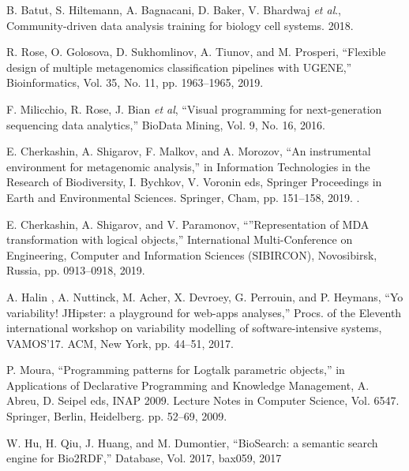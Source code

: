 \documentclass[a4paper]{jpconf}
\begin{document}
\begin{thebibliography}{0}

 B. Batut, S. Hiltemann, A. Bagnacani, D. Baker, V. Bhardwaj \emph{et al}., Community-driven data analysis training for biology cell systems. 2018. 

  R. Rose, O. Golosova, D. Sukhomlinov, A. Tiunov, and M. Prosperi, ``Flexible design of multiple metagenomics classification pipelines with UGENE,'' Bioinformatics, Vol. 35, No. 11, pp. 1963--1965, 2019. 

 F. Milicchio, R. Rose, J. Bian \emph{et al}, ``Visual programming for next-generation sequencing data analytics,'' BioData Mining, Vol. 9, No. 16, 2016. 

 E. Cherkashin, A. Shigarov, F. Malkov, and A. Morozov, ``An instrumental environment for metagenomic analysis,'' in Information Technologies in the Research of Biodiversity, I. Bychkov, V. Voronin eds, Springer Proceedings in Earth and Environmental Sciences. Springer, Cham, pp. 151--158, 2019. .

  E. Cherkashin, A. Shigarov, and V. Paramonov, ``''Representation of MDA transformation with logical objects,'' International Multi-Conference on Engineering, Computer and Information Sciences (SIBIRCON), Novosibirsk, Russia, pp. 0913--0918, 2019. 

 A. Halin , A. Nuttinck, M. Acher, X. Devroey, G. Perrouin, and P. Heymans, ``Yo variability! JHipster: a playground for web-apps analyses,'' Procs. of the Eleventh international workshop on variability modelling of software-intensive systems, VAMOS’17. ACM, New York, pp. 44–51, 2017. 

 P. Moura, ``Programming patterns for Logtalk parametric objects,'' in Applications of Declarative Programming and Knowledge Management, A. Abreu, D. Seipel eds, INAP 2009. Lecture Notes in Computer Science, Vol. 6547. Springer, Berlin, Heidelberg. pp. 52--69, 2009. 

 W. Hu, H. Qiu, J. Huang, and M. Dumontier, ``BioSearch: a semantic search engine for Bio2RDF,'' Database, Vol. 2017, bax059, 2017 














\end{thebibliography}
\end{document}

